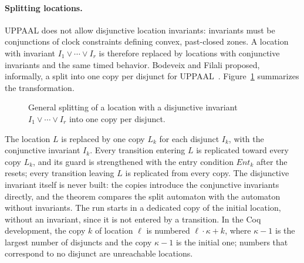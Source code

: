 \paragraph{Splitting locations.}
UPPAAL does not allow disjunctive location invariants: invariants must be
conjunctions of clock constraints defining convex, past-closed zones.  A
location with invariant $I_1\lor\cdots\lor I_r$ is therefore replaced by
locations with conjunctive invariants and the same timed behavior.  Bodeveix
and Filali proposed, informally, a split into one copy per disjunct for
UPPAAL~\cite{[BF03]}.
Figure~\ref{fig:disj-general} summarizes the transformation.

\begin{figure}[t]
\centering
\resizebox{\columnwidth}{!}{}
\caption{General splitting of a location with a disjunctive invariant
$I_1\lor\cdots\lor I_r$ into one copy per disjunct.}
\label{fig:disj-general}
\end{figure}

The location $L$ is replaced by one copy $L_k$ for each disjunct $I_k$, with
the conjunctive invariant $I_k$.  Every transition entering $L$ is replicated
toward every copy $L_k$, and its guard is strengthened with the entry condition
$\mathit{Ent}_k$ after the resets; every transition leaving $L$ is replicated from every
copy.  The disjunctive invariant itself is never built: the copies introduce
the conjunctive invariants directly, and the theorem compares the split
automaton with the automaton without invariants.  The run starts in a dedicated
copy of the initial location, without an invariant, since it is not entered by a
transition.  In the Coq development, the copy $k$ of location $\ell$ is numbered
$\ell\cdot\kappa+k$, where $\kappa-1$ is the largest number of disjuncts and the copy
$\kappa-1$ is the initial one; numbers that correspond to no disjunct are unreachable
locations.

